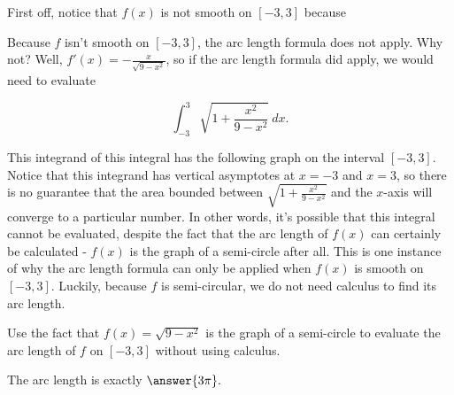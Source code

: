 \documentclass[handout,nooutcomes]{ximera}
\begin{document}
\begin{problem}
First off, notice that $f(x)$ is not smooth on $[-3,3]$ because 
\begin{selectAll}
\end{selectAll}
\end{problem}

Because $f$ isn't smooth on $[-3,3]$, the arc length formula does not apply.  Why not?  Well, $f'(x) = -\frac{x}{\sqrt{9-x^2}}$, so if the arc length formula did apply, we would need to evaluate 

$$\displaystyle\int_{-3}^{3} \sqrt{1+\frac{x^2}{9-x^2}} \ dx.$$ 

This integrand of this integral has the following graph on the interval $[-3,3].$  \\

Notice that this integrand has vertical asymptotes at $x=-3$ and $x=3$, so there is no guarantee that the area bounded between $\sqrt{1+\frac{x^2}{9-x^2}}$ and the $x$-axis will converge to a particular number.  In other words, it's possible that this integral cannot be evaluated, despite the fact that the arc length of $f(x)$ can certainly be calculated - $f(x)$ is the graph of a semi-circle after all.  This is one instance of why the arc length formula can only be applied when $f(x)$ is smooth on $[-3,3]$.  Luckily, because $f$ is semi-circular, we do not need calculus to find its arc length. 

\begin{problem}
Use the fact that $f(x) = \sqrt{9-x^2}$ is the graph of a semi-circle to evaluate the arc length of $f$ on $[-3,3]$ without using calculus.  

The arc length is exactly $\answer{3\pi}.$
\end{problem}
\end{document}
